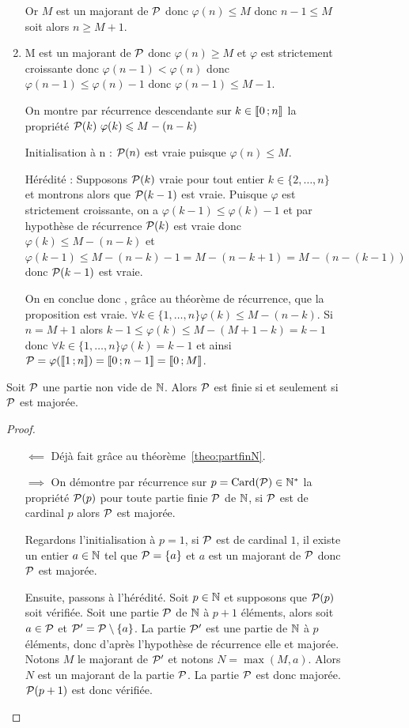 \begin{figure}
\begin{enumerate}
Or \(M\) est un majorant de \(\P\) donc \(\varphi(n)\leqslant M\) donc \(n-1\leqslant M\) soit alors \(n\geqslant M+1\).
\item M est un majorant de \(\P\) donc \(\varphi(n)\geqslant M\) et \(\varphi\) est strictement croissante donc \(\varphi(n-1)<\varphi(n)\) donc \(\varphi(n-1)\leqslant\varphi(n)-1\) donc \(\varphi(n-1)\leqslant M-1\). 

On montre par récurrence descendante sur \(k\in\intervalleentier{0}{n}\) la propriété \(\P(k) \ \varphi(k)\leqslant M-(n-k)\)

Initialisation à n : \(\P(n)\) est vraie puisque \(\varphi(n)\leqslant M\).

Hérédité : Supposons \(\P(k)\) vraie pour tout entier \(k\in\{2, \ldots,n\}\) et montrons alors que \(\P(k-1)\) est vraie. Puisque \(\varphi\) est strictement croissante, on a \(\varphi(k-1)\leqslant \varphi(k)-1\) et par hypothèse de récurrence \(\P(k)\) est vraie donc \(\varphi(k)\leqslant M-(n-k)\) et \(\varphi(k-1)\leqslant M-(n-k)-1=M-(n-k+1)=M-(n-(k-1))\) donc \(\P(k-1)\) est vraie. 

On en conclue donc , grâce au théorème de récurrence, que la proposition est vraie. \(\forall k \in \{1, \ldots, n\} \varphi(k)\leqslant M-(n-k)\). Si \(n=M+1\) alors 
\(k-1\leqslant \varphi(k)\leqslant M - (M+1-k)=k-1\) donc \(\forall k \in \{1, \ldots,n\} \varphi(k)=k-1\) et ainsi \(\P=\varphi(\intervalleentier{1}{n})=\intervalleentier{0}{n-1}= \intervalleentier{0}{M}\).
\end{enumerate}
\begin{prop}
  Soit \(\P\) une partie non vide de \(\N\). Alors \(\P\) est finie si et seulement si\(\P\) est majorée.
\end{prop}
\begin{proof}
  \begin{itemize}
  \item[\(\impliedby\)] Déjà fait grâce au théorème~\ref{theo:partfinN}.
  \item[\(\implies\)] On démontre par récurrence sur \(p=\Card(\P)\in \N^*\) la propriété \(\P(p)\) pour toute partie finie \(\P\) de \(\N\), si \(\P\) est de cardinal \(p\) alors \(\P\) est majorée. 

Regardons l'initialisation à \(p=1\), si \(\P\) est de cardinal \(1\), il existe un entier \(a\in\N\) tel que \(\P=\{a\}\) et \(a\) est un majorant de \(\P\) donc \(\P\) est majorée.

Ensuite, passons à l'hérédité. Soit \(p \in \N\) et supposons que \(\P(p)\) soit vérifiée. Soit une partie \(\P\) de \(\N\) à \(p+1\) éléments, alors soit \(a\in \P\) et \(\P'=\P\setminus\{a\}\). La partie \(\P'\) est une partie de \(\N\) à \(p\) éléments, donc d'après l'hypothèse de récurrence elle et majorée. Notons \(M\) le majorant de \(\P'\) et notons \(N=\max(M,a)\). Alors \(N\) est un majorant de la partie \(\P\). La partie \(\P\) est donc majorée. \(\P(p+1)\) est donc vérifiée.


\end{itemize}
\end{proof}
\end{figure}
